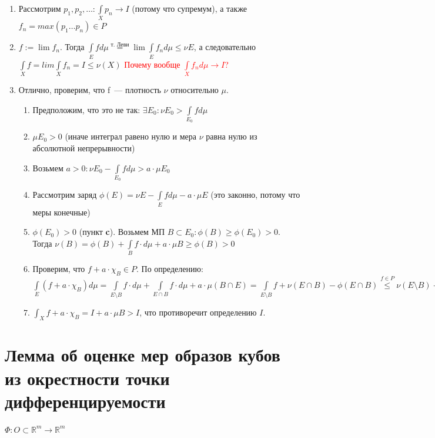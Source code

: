 \documentclass[paper=a4, fontsize=17pt]{article}
\begin{document}
\begin{itemize}
\begin{enumerate}
				$\exists$ последовательсность $f_1 \leq f_2 \leq \dots \in P : \int\limits_X f_n d\mu \rightarrow I$ докажем, что она существует
				\item
				Рассмотрим $p_1, p_2, \dots : \int\limits_X p_n \rightarrow I$ (потому что супремум), а также $f_n = max(p_1 \dots p_n) \in P$
				\item
				$f := \lim f_n$. Тогда $\int\limits_E f d\mu \overset{\text{т. Леви}}{=} \lim \int\limits_E f_n d\mu \leq \nu E$, а следовательно $\int\limits_X f = lim \int\limits_X f_n = I \leq \nu(X)$
				\textcolor{red}{Почему вообще $\int\limits_X f_n d\mu \rightarrow I$?}
				\item
				Отлично, проверим, что f~--- плотность $\nu$ относительно $\mu$.
				\begin{enumerate}
					\item
					Предположим, что это не так: $\exists E_0 : \nu E_0 > \int\limits_{E_0} f d\mu$
					\item
					$\mu E_0 > 0$ (иначе интеграл равено нулю и мера $\nu$ равна нулю из абсолютной непрерывности)
					\item
					Возьмем $a > 0 : \nu E_0 - \int\limits_{E_0} f d\mu > a \cdot \mu E_0$
					\item
					Рассмотрим заряд $\phi(E) = \nu E - \int\limits_E f d\mu - a \cdot \mu E$ (это законно, потому что меры конечные)
					\item
					$\phi(E_0) > 0$ (пункт \textbf{c}). Возьмем МП $B \subset E_0 : \phi(B) \geq \phi(E_0) > 0$. Тогда $\nu(B) = \phi(B) + \int\limits_B f \cdot d\mu + a \cdot \mu B \geq \phi(B) > 0$
					\item
					Проверим, что $f + a \cdot \chi_B \in P$.
                    По определению: $\int\limits_E(f + a \cdot \chi_B)d\mu = \int\limits_{E \setminus B} f \cdot d\mu + \int\limits_{E \cap B} f \cdot d\mu + a \cdot \mu(B \cap E) = \int\limits_{E \setminus B} f + \nu(E \cap B) - \phi (E \cap B) \overset{f \in P}{\leq} \nu(E \setminus B) + \nu(E \cap B) - \phi(E \cap B) = \nu E - \phi(E \cap B) \overset{\phi \geq 0}{\leq} \nu E$
					\item
					$\int_X f + a \cdot \chi_B = I  + a \cdot \mu B > I$, что противоречит определению $I$.
				\end{enumerate}
			\end{enumerate}
		\end{itemize}


\section{Лемма об оценке мер образов кубов из окрестности точки дифференцируемости}
$\Phi: O \subset \mathds{R}^m \rightarrow \mathds{R}^m$
\end{document}
